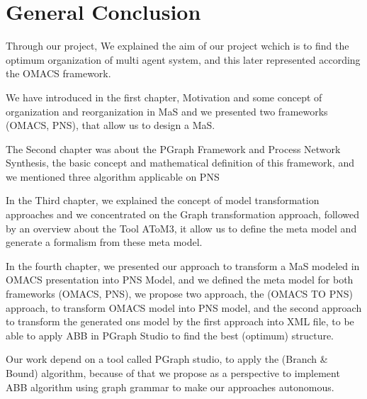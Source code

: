 
\chapter*{General Conclusion}


Through our project, We explained the aim of our project wchich is to find the optimum organization of multi agent system, and this later represented according the OMACS framework.

We have introduced in the first chapter, Motivation and some concept of organization and reorganization in MaS and we presented two frameworks (OMACS, PNS), that allow us to design a MaS.

The Second chapter was about the PGraph Framework and Process Network Synthesis, the basic concept and mathematical definition  of this framework, and we mentioned 
three algorithm applicable on PNS 

In the Third chapter, we explained the concept of model transformation approaches and we concentrated on the Graph transformation approach, followed by an overview about the Tool AToM3, it allow us to define the meta model and generate a formalism from these meta model.

In the fourth chapter, we presented our approach to transform a MaS modeled in OMACS presentation into PNS Model, and 
we defined the meta model for both frameworks (OMACS, PNS), 
we propose two approach, the (OMACS TO PNS) approach, to transform OMACS model into PNS model, and the second approach  to transform the generated ons model by the first approach into XML file, to be able to apply ABB in PGraph Studio to find the best (optimum) structure.

Our work depend on a tool called PGraph studio, to apply the (Branch \& Bound) algorithm, because of that we propose as a perspective to implement ABB algorithm using graph grammar to make our approaches autonomous.